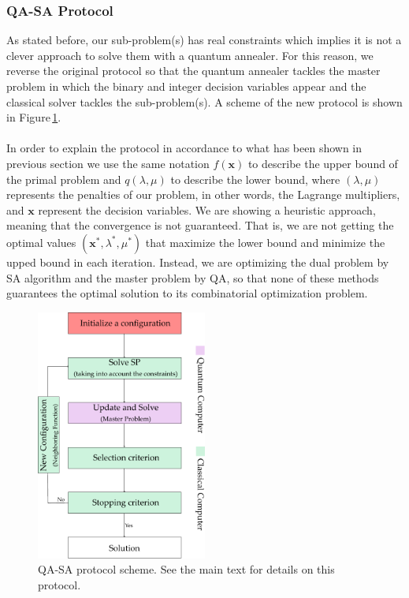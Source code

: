 \subsubsection{QA-SA Protocol}
 As stated before, our sub-problem(s) has real constraints which implies it is not a clever approach to solve them with a quantum annealer. For this reason, we reverse the original protocol so that the quantum annealer tackles the master problem in which the binary and integer decision variables appear and the classical solver tackles the sub-problem(s). A scheme of the new protocol is shown in Figure\,\ref{fig:QA_SAProtocol}.\\\\
In order to explain the protocol in accordance to what has been shown in previous section we use the same notation $f(\mathbf{x})$ to describe the upper bound of the primal problem and $q(\lambda,\mu)$ to describe the lower bound, where $(\lambda,\mu)$ represents the penalties of our problem, in other words, the Lagrange multipliers, and $\mathbf{x}$ represent the decision variables. We are showing a heuristic approach, meaning that the convergence is not guaranteed. That is, we are not getting the optimal values $(\mathbf{x}^{*}, \lambda^{*},\mu^{*})$ that maximize the lower bound and minimize the upped bound in each iteration. Instead, we are optimizing the dual problem by SA algorithm and the master problem by QA, so that none of these methods guarantees the optimal solution to its combinatorial optimization problem.
\begin{figure}[H]
\centering
\includegraphics[width=0.5\textwidth]{Figures/QASAProtocol.pdf} 
\caption{QA-SA protocol scheme. See the main text for details on this protocol.}
\label{fig:QA_SAProtocol}
\end{figure}
